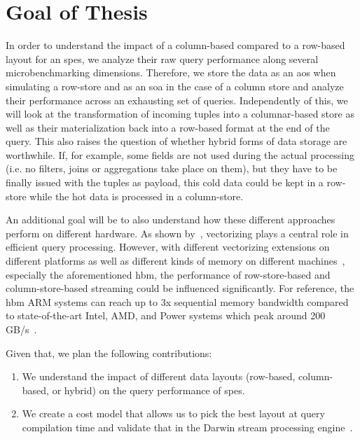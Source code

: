 \section{Goal of Thesis}
\label{sec:goal}

In order to understand the impact of a column-based compared to a row-based layout for an \acp{spe}, we analyze their raw query performance along several microbenchmarking dimensions.
Therefore, we store the data as an \ac{aos} when simulating a row-store and as an \ac{soa} in the case of a column store and analyze their performance across an exhausting set of queries.
Independently of this, we will look at the transformation of incoming tuples into a columnar-based store as well as their materialization back into a row-based format at the end of the query.
This also raises the question of whether hybrid forms of data storage are worthwhile.
If, for example, some fields are not used during the actual processing (i.e. no filters, joins or aggregations take place on them), but they have to be finally issued with the tuples as payload, this cold data could be kept in a row-store while the hot data is processed in a column-store.

An additional goal will be to also understand how these different approaches perform on different hardware.
As shown by~\citet{DBLP:journals/pvldb/KerstenLKNPB18}, vectorizing plays a central role in efficient query processing.
However, with different vectorizing extensions on different platforms as well as different kinds of memory on different machines~\cite[]{bollmeier2021processor}, especially the aforementioned \ac{hbm}, the performance of row-store-based and column-store-based streaming could be influenced significantly.
For reference, the \ac{hbm} ARM systems can reach up to 3x sequential memory bandwidth compared to state-of-the-art Intel, AMD, and Power systems which peak around 200 GB/s~\cite[]{bollmeier2021processor}.

Given that, we plan the following contributions:
\begin{enumerate}
    \item We understand the impact of different data layouts (row-based, column-based, or hybrid) on the query performance of \acp{spe}.
    \item We create a cost model that allows us to pick the best layout at query compilation time and validate that in the Darwin stream processing engine~\cite[]{DBLP:conf/cidr/BensonR22}.
\end{enumerate}